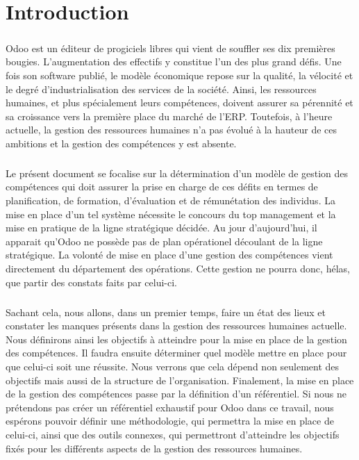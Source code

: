 \chapter*{Introduction}
\paragraph{}
Odoo est un éditeur de progiciels libres qui vient de souffler ses dix premières bougies. L'augmentation des effectifs y constitue l'un des plus grand défis. 
Une fois son software publié, le modèle économique repose sur la qualité, la vélocité et le degré d’industrialisation des services de la société. Ainsi, les ressources humaines, et plus spécialement leurs compétences, doivent assurer sa pérennité et sa croissance vers la première place du marché de l'ERP. Toutefois, à l'heure actuelle, la gestion des ressources humaines n'a pas évolué à la hauteur de ces ambitions et la gestion des compétences y est absente. 

\paragraph{}Le présent document se focalise sur la détermination d'un modèle de gestion des compétences qui doit assurer la prise en charge de ces défits en termes de planification, de formation, d'évaluation et de rémunétation des individus. La mise en place d'un tel système nécessite le concours du top management et la mise en pratique de la ligne stratégique décidée. Au jour d'aujourd'hui, il apparait qu'Odoo ne possède pas de plan opérationel découlant de la ligne stratégique. La volonté de mise en place d'une gestion des compétences vient directement du département des opérations. Cette gestion ne pourra donc, hélas, que partir des constats faits par celui-ci. 

\paragraph{}Sachant cela, nous allons, dans un premier temps, faire un état des lieux et constater les manques présents dans la gestion des ressources humaines actuelle. Nous définirons ainsi les objectifs à atteindre pour la mise en place de la gestion des compétences. Il faudra ensuite déterminer quel modèle mettre en place pour que celui-ci soit une réussite. Nous verrons que cela dépend non seulement des objectifs mais aussi de la structure de l'organisation. Finalement, la mise en place de la gestion des compétences passe par la définition d'un référentiel. Si nous ne prétendons pas créer un référentiel exhaustif pour Odoo dans ce travail, nous espérons pouvoir définir une méthodologie, qui permettra la mise en place de celui-ci, ainsi que des outils connexes, qui permettront d'atteindre les objectifs fixés pour les différents aspects de la gestion des ressources humaines. 
